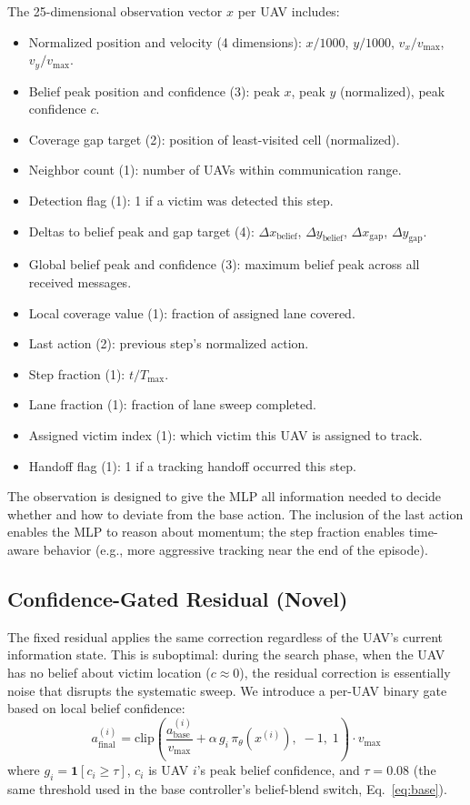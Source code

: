 \documentclass[journal]{IEEEtran}
\begin{document}
The 25-dimensional observation vector $x$ per UAV includes:
\begin{itemize}
  \item Normalized position and velocity (4 dimensions): $x/1000$, $y/1000$,
        $v_x/v_{\max}$, $v_y/v_{\max}$.
  \item Belief peak position and confidence (3): peak $x$, peak $y$ (normalized),
        peak confidence $c$.
  \item Coverage gap target (2): position of least-visited cell (normalized).
  \item Neighbor count (1): number of UAVs within communication range.
  \item Detection flag (1): 1 if a victim was detected this step.
  \item Deltas to belief peak and gap target (4): $\Delta x_{\text{belief}}$,
        $\Delta y_{\text{belief}}$, $\Delta x_{\text{gap}}$, $\Delta y_{\text{gap}}$.
  \item Global belief peak and confidence (3): maximum belief peak across all
        received messages.
  \item Local coverage value (1): fraction of assigned lane covered.
  \item Last action (2): previous step's normalized action.
  \item Step fraction (1): $t / T_{\max}$.
  \item Lane fraction (1): fraction of lane sweep completed.
  \item Assigned victim index (1): which victim this UAV is assigned to track.
  \item Handoff flag (1): 1 if a tracking handoff occurred this step.
\end{itemize}

The observation is designed to give the MLP all information needed to decide whether
and how to deviate from the base action. The inclusion of the last action enables
the MLP to reason about momentum; the step fraction enables time-aware behavior
(e.g., more aggressive tracking near the end of the episode).

\subsection{Confidence-Gated Residual (Novel)}
\label{sec:gated}

The fixed residual applies the same correction regardless of the UAV's current
information state. This is suboptimal: during the search phase, when the UAV has
no belief about victim location ($c \approx 0$), the residual correction is
essentially noise that disrupts the systematic sweep. We introduce a per-UAV binary
gate based on local belief confidence:
\begin{equation}
  a_{\text{final}}^{(i)} = \mathrm{clip}\!\left(
    \frac{a_{\text{base}}^{(i)}}{v_{\max}} + \alpha\,g_i\,\pi_\theta(x^{(i)}),\; -1,\; 1
  \right) \cdot v_{\max}
  \label{eq:gated}
\end{equation}
where $g_i = \mathbf{1}[c_i \geq \tau]$, $c_i$ is UAV $i$'s peak belief confidence,
and $\tau = 0.08$ (the same threshold used in the base controller's belief-blend
switch, Eq.~\eqref{eq:base}).
\end{document}
